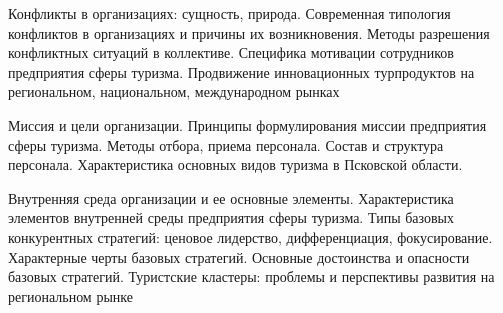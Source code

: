\documentclass[
	11pt,
	a4paper,
	]
	{article}
\begin{document}
\noindent{} 
	{
		Конфликты в организациях: сущность, природа. Современная типология конфликтов в организациях и причины их возникновения. Методы разрешения конфликтных ситуаций в коллективе.
	}{
		Специфика мотивации сотрудников предприятия сферы туризма.
	}{
		Продвижение инновационных турпродуктов на региональном, национальном, международном рынках
	}

\bigskip

\noindent{} 
	{
		Миссия и цели организации. Принципы формулирования миссии предприятия сферы туризма.
	}{
		Методы отбора, приема персонала. Состав и структура персонала.
	}{
		Характеристика основных видов туризма в Псковской области.
	}

\bigskip

\noindent{} 
	{
		Внутренняя среда организации и ее основные элементы. Характеристика элементов внутренней среды предприятия сферы туризма.
	}{
		Типы базовых конкурентных стратегий: ценовое лидерство, дифференциация, фокусирование. Характерные черты базовых стратегий. Основные достоинства и опасности базовых стратегий.
	}{
		Туристские кластеры: проблемы и перспективы развития на региональном рынке
	}

\bigskip
\end{document}
